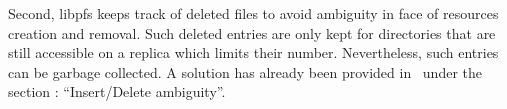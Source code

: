 Second, libpfs keeps track of deleted files to avoid ambiguity in face
of resources creation and removal. Such deleted entries are only kept
for directories that are still accessible on a replica which limits
their number. Nevertheless, such entries can be garbage collected. A
solution has already been provided in~\cite{page:ficus} under the
section : ``Insert/Delete ambiguity''.

\endinput


